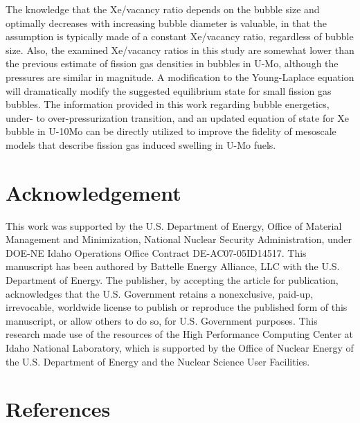 \documentclass[review]{elsarticle}
\begin{document}
The knowledge that the Xe/vacancy ratio depends on the bubble size and optimally decreases with increasing bubble diameter is valuable, in that the assumption is typically made of a constant Xe/vacancy ratio, regardless of bubble size. Also, the examined Xe/vacancy ratios in this study are somewhat lower than the previous estimate of fission gas densities in bubbles in U-Mo, although the pressures are similar in magnitude. A modification to the Young-Laplace equation will dramatically modify the suggested equilibrium state for small fission gas bubbles. The information provided in this work regarding bubble energetics, under- to over-pressurization transition, and an updated equation of state for Xe bubble in U-10Mo can be directly utilized to improve the fidelity of mesoscale models that describe fission gas induced swelling in U-Mo fuels. 

\section{Acknowledgement}
This work was supported by the U.S. Department of Energy, Office of Material Management and Minimization, National Nuclear Security Administration, under DOE-NE Idaho Operations Office Contract DE-AC07-05ID14517. This manuscript has been authored by Battelle Energy Alliance, LLC with the U.S. Department of Energy. The publisher, by accepting the article for publication, acknowledges that the U.S. Government retains a nonexclusive, paid-up, irrevocable, worldwide license to publish or reproduce the published form of this manuscript, or allow others to do so, for U.S. Government purposes. This research made use of the resources of the High Performance Computing Center at Idaho National Laboratory, which is supported by the Office of Nuclear Energy of the U.S. Department of Energy and the Nuclear Science User Facilities.

\section{References}


\end{document}
